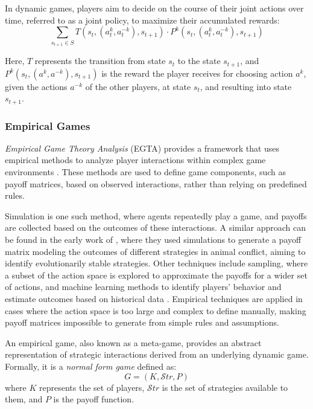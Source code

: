         \noindent
        In dynamic games, players aim to decide on the course of their joint actions over time, referred to as a joint policy, to maximize their accumulated rewards:
        \begin{equation}
            \sum_{s_{t+1} \in S} T(s_t, (a_t^k, a_t^{-k}), s_{t+1}) \cdot P^k(s_t, (a_t^k, a_t^{-k}), s_{t+1})
            \label{eq:acc_rewards}
        \end{equation}      
        
        Here, $T$ represents the transition from state $s_t$ to the state $s_{t+1}$, and $P^k(s_{t}, (a^k, a^{-k}), s_{t+1})$ is the reward the player receives for choosing action $a^k$, given the actions $a^{-k}$ of the other players, at state $s_{t}$, and resulting into state $s_{t+1}$.

    \subsubsection{Empirical Games}

        \emph{Empirical Game Theory Analysis} (EGTA) provides a framework that uses empirical methods to analyze player interactions within complex game environments \cite{Levet2016GameT}. These methods are used to define game components, such as payoff matrices, based on observed interactions, rather than relying on predefined rules.\tinydouble 
        
        \noindent
        Simulation is one such method, where agents repeatedly play a game, and payoffs are collected based on the outcomes of these interactions. A similar approach can be found in the early work of \cite{SMITH1973}, where they used simulations to generate a payoff matrix modeling the outcomes of different strategies in animal conflict, aiming to identify evolutionarily stable strategies. Other techniques include sampling, where a subset of the action space is explored to approximate the payoffs for a wider set of actions, and machine learning methods to identify players' behavior and estimate outcomes based on historical data \cite{wellman2024empiricalgametheoreticanalysissurvey}. Empirical techniques are applied in cases where the action space is too large and complex to define manually, making payoff matrices impossible to generate from simple rules and assumptions.\tinydouble

        \noindent
        An empirical game, also known as a meta-game, provides an abstract representation of strategic interactions derived from an underlying dynamic game. Formally, it is a \emph{normal form game} defined as:
        \begin{equation}
            G = (K, \mathcal{S}tr, P)
            \label{eq:nfg}
        \end{equation}        
        where $K$ represents the set of players, $\mathcal{S}tr$ is the set of strategies available to them, and $P$ is the payoff function.\tinydouble
        
